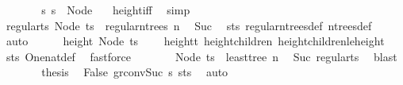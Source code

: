 \begin{isabellebody}
\ \ \ \ \isamarkupfalse%
\ \isamarkupfalse%
\ s{\isacharcolon}{\kern0pt}\ {\isachardoublequoteopen}s\ {\isacharequal}{\kern0pt}\ Node\ {\isacharbrackleft}{\kern0pt}{\isacharbrackright}{\kern0pt}{\isachardoublequoteclose}\ \isamarkupfalse%
\ height{\isacharunderscore}{\kern0pt}{}{\isacharunderscore}{\kern0pt}iff\ \isamarkupfalse%
\ simp\isanewline
\ \ \ \ \isamarkupfalse%
\ \isamarkupfalse%
\ regular{\isacharunderscore}{\kern0pt}ts{\isacharcolon}{\kern0pt}\ {\isachardoublequoteopen}Node\ ts\ {\isasymin}\ regular{\isacharunderscore}{\kern0pt}n{\isacharunderscore}{\kern0pt}trees\ n{\isachardoublequoteclose}\ \isamarkupfalse%
\ Suc{\isacharparenleft}{\kern0pt}{}{\isacharparenright}{\kern0pt}\ \isamarkupfalse%
\ s{\isacharunderscore}{\kern0pt}ts\ regular{\isacharunderscore}{\kern0pt}n{\isacharunderscore}{\kern0pt}trees{\isacharunderscore}{\kern0pt}def\ n{\isacharunderscore}{\kern0pt}trees{\isacharunderscore}{\kern0pt}def\ \isamarkupfalse%
\ auto\isanewline
\ \ \ \ \isamarkupfalse%
\ {\isachardoublequoteopen}height\ {\isacharparenleft}{\kern0pt}Node\ ts{\isacharparenright}{\kern0pt}\ {\isacharless}{\kern0pt}\ {}{\isachardoublequoteclose}\ \isamarkupfalse%
\ height{\isacharunderscore}{\kern0pt}t\ height{\isacharunderscore}{\kern0pt}children\ height{\isacharunderscore}{\kern0pt}children{\isacharunderscore}{\kern0pt}le{\isacharunderscore}{\kern0pt}height\ \isamarkupfalse%
\ s{\isacharunderscore}{\kern0pt}ts\ One{\isacharunderscore}{\kern0pt}nat{\isacharunderscore}{\kern0pt}def\ \isamarkupfalse%
\ fastforce\isanewline
\ \ \ \ \isamarkupfalse%
\ \isamarkupfalse%
\ {\isachardoublequoteopen}Node\ ts\ {\isacharequal}{\kern0pt}\ least{\isacharunderscore}{\kern0pt}tree\ n{\isachardoublequoteclose}\ \isamarkupfalse%
\ Suc{\isacharparenleft}{\kern0pt}{}{\isacharparenright}{\kern0pt}\ regular{\isacharunderscore}{\kern0pt}ts\ \isamarkupfalse%
\ blast\isanewline
\ \ \ \ \isamarkupfalse%
\ \isamarkupfalse%
\ {\isacharquery}{\kern0pt}thesis\ \isamarkupfalse%
\ False\ gr{}{\isacharunderscore}{\kern0pt}conv{\isacharunderscore}{\kern0pt}Suc\ s\ s{\isacharunderscore}{\kern0pt}ts\ \isamarkupfalse%
\ auto\isanewline
\ \ \isamarkupfalse%
\isanewline
{}\isamarkupfalse%

\end{isabellebody}
